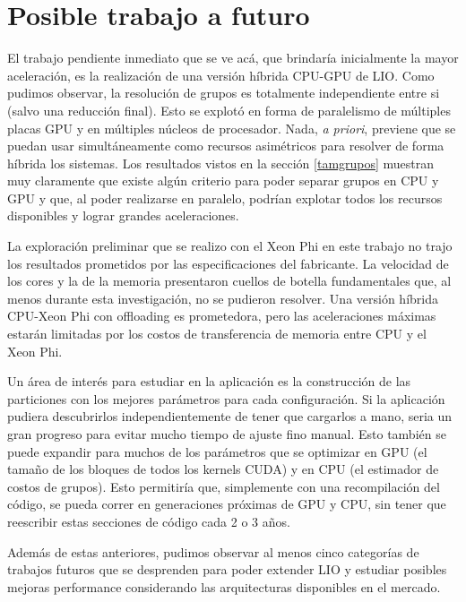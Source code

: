 \section{Posible trabajo a futuro}

El trabajo pendiente inmediato que se ve ac\'a, que brindar\'ia inicialmente la mayor aceleraci\'on,
es la realizaci\'on de una versi\'on h\'ibrida CPU-GPU de LIO. Como pudimos observar, la resoluci\'on de grupos es
totalmente independiente entre si (salvo una reducci\'on final). Esto se explot\'o en forma de paralelismo
de m\'ultiples placas GPU y en m\'ultiples n\'ucleos de procesador. Nada, \textit{a priori}, previene
que se puedan usar simult\'aneamente como recursos asim\'etricos para resolver de forma h\'ibrida los sistemas.
Los resultados vistos en la secci\'on \ref{tamgrupos} muestran muy claramente que existe alg\'un criterio
para poder separar grupos en CPU y GPU y que, al poder realizarse en paralelo, podr\'ian explotar
todos los recursos disponibles y lograr grandes aceleraciones.

La exploraci\'on preliminar que se realizo con el Xeon Phi en este trabajo no trajo los resultados
prometidos por las especificaciones del fabricante. La velocidad de los cores y la de la memoria
presentaron cuellos de botella fundamentales que, al menos durante esta investigaci\'on, no se
pudieron resolver. Una versi\'on h\'ibrida CPU-Xeon Phi con offloading es prometedora, pero las aceleraciones m\'aximas
estar\'an limitadas por los costos de transferencia de memoria entre CPU y el Xeon Phi.

Un \'area de inter\'es para estudiar en la aplicaci\'on es la construcci\'on de las particiones
con los mejores par\'ametros para cada configuraci\'on. Si la aplicaci\'on pudiera descubrirlos
independientemente de tener que cargarlos a mano, seria un gran progreso para evitar mucho
tiempo de ajuste fino manual. Esto tambi\'en se puede expandir para muchos de los par\'ametros
que se optimizar en GPU (el tama\~no de los bloques de todos los kernels CUDA) y en CPU (el estimador de costos
de grupos).
Esto permitir\'ia que, simplemente con una recompilaci\'on del c\'odigo, se pueda correr en generaciones
pr\'oximas de GPU y CPU, sin tener que reescribir estas secciones de c\'odigo cada 2 o 3 a\~nos.

Adem\'as de estas anteriores, pudimos observar al menos cinco categor\'ias de trabajos futuros que se
desprenden para poder extender LIO y estudiar posibles mejoras performance considerando
las arquitecturas disponibles en el mercado.
